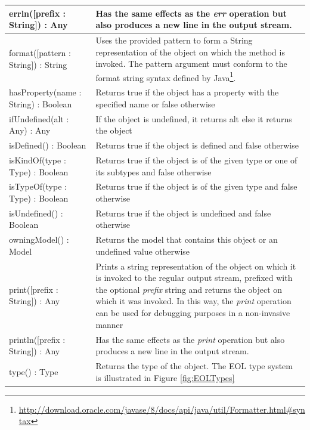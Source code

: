 \begin{longtabu} {|p{6.5cm}|X|}
    errln([prefix : String]) : Any & Has the same effects as the \emph{err} operation but also produces a new line in the output stream. \\\hline
    
    format([pattern : String]) : String & Uses the provided pattern to form a String representation of the object on which the method is invoked. The pattern argument must conform to the format string syntax defined by Java\footnote{\url{http://download.oracle.com/javase/8/docs/api/java/util/Formatter.html\#syntax}}. \\\hline
    
    hasProperty(name : String) : Boolean & Returns true if the object has a property with the specified name or false otherwise \\\hline
    
    ifUndefined(alt : Any) : Any & If the object is undefined, it returns alt else it returns the object \\\hline
    
    isDefined() : Boolean & Returns true if the object is defined and false otherwise \\\hline
    
    isKindOf(type : Type) : Boolean & Returns true if the object is of the given type or one of its subtypes and false otherwise \\\hline
    
    isTypeOf(type : Type) : Boolean & Returns true if the object is of the given type and false otherwise \\\hline
    
    isUndefined() : Boolean & Returns true if the object is undefined and false otherwise \\\hline
    
    owningModel() : Model & Returns the model that contains this object or an undefined value otherwise \\\hline
    
    print([prefix : String]) : Any & Prints a string representation of the object on which it is invoked to the regular output stream, prefixed with the optional \emph{prefix} string and returns the object on which it was invoked. In this way, the \emph{print} operation can be used for debugging purposes in a non-invasive manner\\\hline
    
    println([prefix : String]) : Any & Has the same effects as the \emph{print} operation but also produces a new line in the output stream. \\\hline
    
    type() : Type & Returns the type of the object. The EOL type system is illustrated in Figure \ref{fig:EOLTypes} \\\hline

\end{longtabu}


